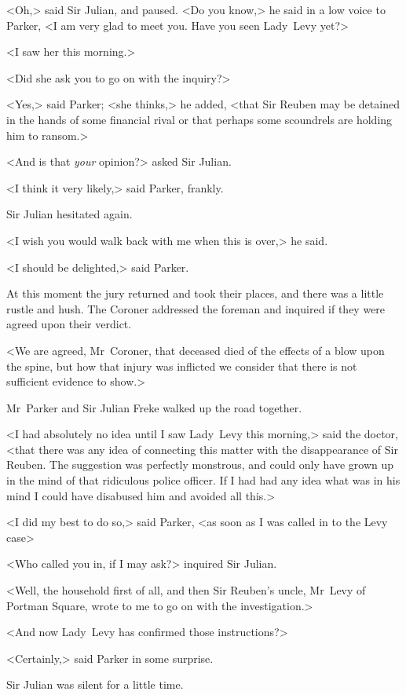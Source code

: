 <Oh,> said Sir Julian, and paused. <Do you know,> he said in a low voice to Parker, <I am very glad to meet you. Have you seen Lady~Levy yet?>

<I saw her this morning.>

<Did she ask you to go on with the inquiry?>

<Yes,> said Parker; <she thinks,> he added, <that Sir Reuben may be detained in the hands of some financial rival or that perhaps some scoundrels are holding him to ransom.>

<And is that \emph{your} opinion?> asked Sir Julian.

<I think it very likely,> said Parker, frankly.

Sir Julian hesitated again.

<I wish you would walk back with me when this is over,> he said.

<I should be delighted,> said Parker.

At this moment the jury returned and took their places, and there was a little rustle and hush. The Coroner addressed the foreman and inquired if they were agreed upon their verdict.

<We are agreed, Mr~Coroner, that deceased died of the effects of a blow upon the spine, but how that injury was inflicted we consider that there is not sufficient evidence to show.>

Mr~Parker and Sir Julian Freke walked up the road together.

<I had absolutely no idea until I saw Lady~Levy this morning,> said the doctor, <that there was any idea of connecting this matter with the disappearance of Sir Reuben. The suggestion was perfectly monstrous, and could only have grown up in the mind of that ridiculous police officer. If I had had any idea what was in his mind I could have disabused him and avoided all this.>

<I did my best to do so,> said Parker, <as soon as I was called in to the Levy case\longdash>

<Who called you in, if I may ask?> inquired Sir Julian.

<Well, the household first of all, and then Sir Reuben's uncle, Mr~Levy of Portman Square, wrote to me to go on with the investigation.>

<And now Lady~Levy has confirmed those instructions?>

<Certainly,> said Parker in some surprise.

Sir Julian was silent for a little time.

